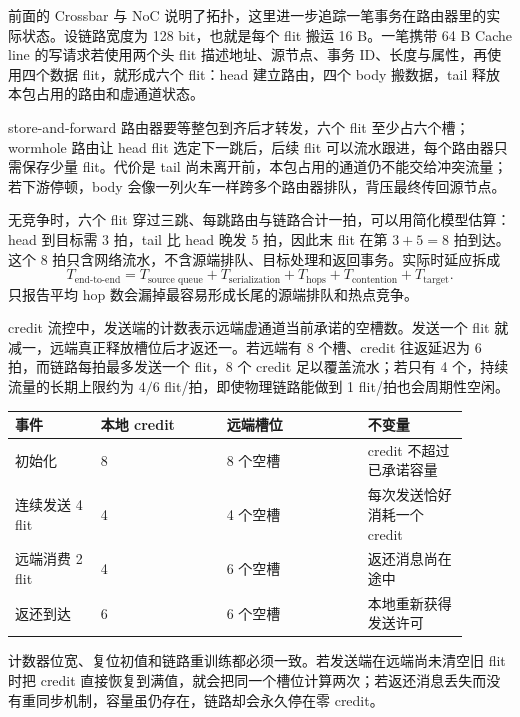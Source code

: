前面的 Crossbar 与 NoC 说明了拓扑，这里进一步追踪一笔事务在路由器里的实际状态。设链路宽度为 128 bit，也就是每个 flit 搬运 16 B。一笔携带 64 B Cache line 的写请求若使用两个头 flit 描述地址、源节点、事务 ID、长度与属性，再使用四个数据 flit，就形成六个 flit：head 建立路由，四个 body 搬数据，tail 释放本包占用的路由和虚通道状态。


store-and-forward 路由器要等整包到齐后才转发，六个 flit 至少占六个槽；wormhole 路由让 head flit 选定下一跳后，后续 flit 可以流水跟进，每个路由器只需保存少量 flit。代价是 tail 尚未离开前，本包占用的通道仍不能交给冲突流量；若下游停顿，body 会像一列火车一样跨多个路由器排队，背压最终传回源节点。

无竞争时，六个 flit 穿过三跳、每跳路由与链路合计一拍，可以用简化模型估算：head 到目标需 3 拍，tail 比 head 晚发 5 拍，因此末 flit 在第 $3+5=8$ 拍到达。这个 8 拍只含网络流水，不含源端排队、目标处理和返回事务。实际时延应拆成
\[
T_{\text{end-to-end}}
=T_{\text{source queue}}+T_{\text{serialization}}
+T_{\text{hops}}+T_{\text{contention}}+T_{\text{target}} .
\]
只报告平均 hop 数会漏掉最容易形成长尾的源端排队和热点竞争。


credit 流控中，发送端的计数表示远端虚通道当前承诺的空槽数。发送一个 flit 就减一，远端真正释放槽位后才返还一。若远端有 8 个槽、credit 往返延迟为 6 拍，而链路每拍最多发送一个 flit，8 个 credit 足以覆盖流水；若只有 4 个，持续流量的长期上限约为 $4/6$ flit/拍，即使物理链路能做到 1 flit/拍也会周期性空闲。

\begin{longtable}{L{0.17\linewidth}L{0.25\linewidth}L{0.28\linewidth}L{0.20\linewidth}}
\toprule
事件 & 本地 credit & 远端槽位 & 不变量 \\
\midrule
初始化 & 8 & 8 个空槽 & credit 不超过已承诺容量 \\\tablerowrule
连续发送 4 flit & 4 & 4 个空槽 & 每次发送恰好消耗一个 credit \\\tablerowrule
远端消费 2 flit & 4 & 6 个空槽 & 返还消息尚在途中 \\\tablerowrule
返还到达 & 6 & 6 个空槽 & 本地重新获得发送许可 \\
\bottomrule
\end{longtable}

计数器位宽、复位初值和链路重训练都必须一致。若发送端在远端尚未清空旧 flit 时把 credit 直接恢复到满值，就会把同一个槽位计算两次；若返还消息丢失而没有重同步机制，容量虽仍存在，链路却会永久停在零 credit。

